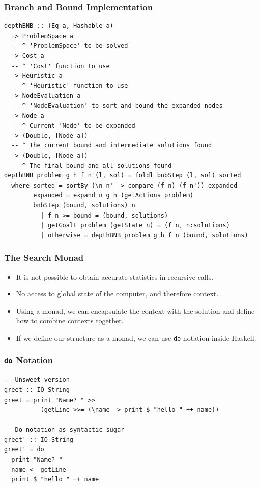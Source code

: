 \documentclass{beamer}
\begin{document}
\begin{frame}[fragile]
  \frametitle{Branch and Bound Implementation}
\begin{lstlisting}[style=haskell]
depthBNB :: (Eq a, Hashable a)
  => ProblemSpace a
  -- ^ 'ProblemSpace' to be solved
  -> Cost a
  -- ^ 'Cost' function to use
  -> Heuristic a
  -- ^ 'Heuristic' function to use
  -> NodeEvaluation a
  -- ^ 'NodeEvaluation' to sort and bound the expanded nodes
  -> Node a
  -- ^ Current 'Node' to be expanded
  -> (Double, [Node a])
  -- ^ The current bound and intermediate solutions found
  -> (Double, [Node a])
  -- ^ The final bound and all solutions found
depthBNB problem g h f n (l, sol) = foldl bnbStep (l, sol) sorted
  where sorted = sortBy (\n n' -> compare (f n) (f n')) expanded
        expanded = expand n g h (getActions problem)
        bnbStep (bound, solutions) n
          | f n >= bound = (bound, solutions)
          | getGoalF problem (getState n) = (f n, n:solutions)
          | otherwise = depthBNB problem g h f n (bound, solutions)
\end{lstlisting}
\end{frame}

\begin{frame}
  \frametitle{The Search Monad}
  \begin{itemize}
  \item It is not possible to obtain accurate statistics in recursive calls.
  \item No access to global state of the computer, and therefore context.
  \item Using a monad, we can encapsulate the context with the solution and
    define how to combine contexts together.
  \item If we define our structure as a monad, we can use \texttt{do} notation
    inside Haskell.
  \end{itemize}
\end{frame}

\begin{frame}[fragile]
  \frametitle{\texttt{do} Notation}
\begin{lstlisting}[style=haskell]
-- Unsweet version
greet :: IO String
greet = print "Name? " >>
          (getLine >>= (\name -> print $ "hello " ++ name))

-- Do notation as syntactic sugar
greet' :: IO String
greet' = do
  print "Name? "
  name <- getLine
  print $ "hello " ++ name
\end{lstlisting}
\end{frame}
\end{document}
